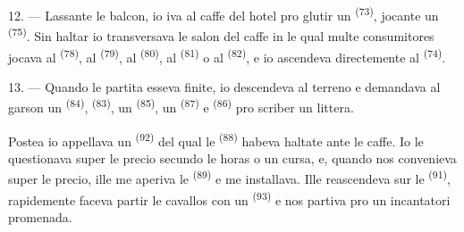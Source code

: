 12. --- Lassante le balcon, io iva al caffe del hotel pro glutir un
 \textsuperscript{(73)}, jocante un 
\textsuperscript{(75)}. Sin haltar io transversava le salon del caffe in le qual
multe consumitores jocava al  \textsuperscript{(78)}, al
 \textsuperscript{(79)}, al 
\textsuperscript{(80)}, al  \textsuperscript{(81)} o al
 \textsuperscript{(82)}, e io ascendeva directemente al
 \textsuperscript{(74)}.

13. --- Quando le partita esseva finite, io descendeva al terreno e demandava al
garson un  \textsuperscript{(84)}, 
\textsuperscript{(83)}, un  \textsuperscript{(85)}, un
 \textsuperscript{(87)} e  \textsuperscript{(86)}
pro scriber un littera.

Postea io appellava un  \textsuperscript{(92)} del qual le
 \textsuperscript{(88)} habeva haltate ante le caffe. Io le
questionava super le precio secundo le horas o un cursa, e, quando nos
convenieva super le precio, ille me aperiva le 
\textsuperscript{(89)} e me installava. Ille reascendeva sur le 
\textsuperscript{(91)}, rapidemente faceva partir le cavallos con un
 \textsuperscript{(93)} e nos partiva pro un incantatori
promenada.
\VUsaut{6.0mm}
\VUfilet{22mm}
